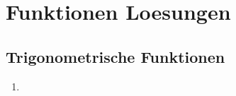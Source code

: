 \chapter{Funktionen Loesungen}

\section{Trigonometrische Funktionen}
\begin{enumerate}
	\item
	
	
  	 \begin{enumerate}
  	 

\end{enumerate}
\end{enumerate}
